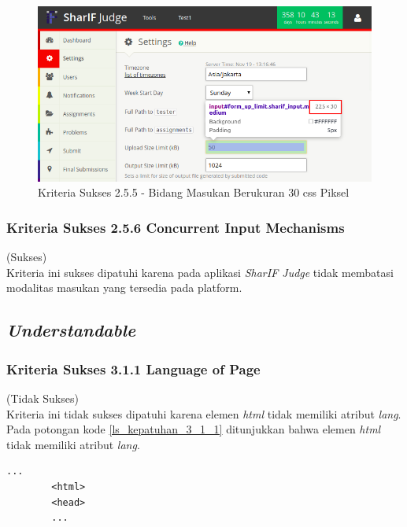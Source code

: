 \documentclass[a4paper,twoside]{article}
\begin{document}
\begin{enumerate}
		\begin{figure}[H]
			\centering  
			\includegraphics[scale=0.5]{kepatuhan_2_5_5}  
			\caption[Kriteria Sukses 2.5.5 - Bidang Masukan Berukuran 30 css Piksel]{Kriteria Sukses 2.5.5 - Bidang Masukan Berukuran 30 css Piksel} 
			\label{fig:kepatuhan_2_5_5} 
		\end{figure}
		
		\subsubsection*{Kriteria Sukses 2.5.6 Concurrent Input Mechanisms}
		\label{subsubsec:kepatuhan_kriteria_2.5.6}
		(Sukses) \\
		
		Kriteria ini sukses dipatuhi karena pada aplikasi \textit{SharIF Judge} tidak membatasi modalitas masukan yang tersedia pada platform.
		
		\subsection*{\textit{Understandable}}
		\label{subsec:kepatuhan_understandable}
		
		\subsubsection*{Kriteria Sukses 3.1.1 Language of Page}
		\label{subsubsec:kepatuhan_kriteria_3.1.1}
		(Tidak Sukses) \\
		
		Kriteria ini tidak sukses dipatuhi karena elemen \textit{html} tidak memiliki atribut \textit{lang}. Pada potongan kode \ref{ls_kepatuhan_3_1_1} ditunjukkan bahwa elemen \textit{html} tidak memiliki atribut \textit{lang}.
		\begin{lstlisting}[basicstyle=\ttfamily, frame=single,
		columns=fullflexible, keepspaces=true, breaklines=true, label=ls_kepatuhan_3_1_1, caption=Kriteria Sukses 3.1.1 - Elemen \textit{HTML}]
		...
		<html>
		<head>
		...
		\end{lstlisting}
		

\end{enumerate}
\end{document}
